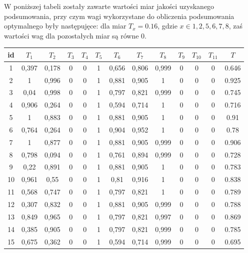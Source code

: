 \documentclass{classrep}
\begin{document}
W poniższej tabeli zostały zawarte wartości miar jakości uzyskanego podsumowania, przy czym wagi wykorzystane do
obliczenia podsumowania optymalnego były następujęce: dla miar $T_{x} = 0.16$, gdzie $x \in {1,2,5,6,7,8}$, zaś wartości wag dla pozostałych miar są równe 0.

\begin{center}
  \begin{table}[H]
    \begin{adjustbox}{center=11cm}
    \begin{tabularx}{\textwidth}{ccccccccccccc}
    
    id & $T_1$ & $T_2$ & $T_3$ & $T_4$ & $T_5$ & $T_6$ & $T_7$ & $T_8$ & $T_9$ & $T_{10}$ & $T_{11}$ & $T$ \\ \hline 

    1 &0,397 & 0,178 & 0 & 0 & 1 & 0,656 & 0,806 & 0,999 & 0 & 0 & 0 & 0.646 \\ \hline
    2 &1 & 0,996 & 0 & 0 & 1 & 0,881 & 0,905 & 1 & 0 & 0 & 0 & 0.925\\ \hline
    3 &0,04 & 0,998 & 0 & 0 & 1 & 0,797 & 0,821 & 0,999 & 0 & 0 & 0 & 0.745 \\ \hline
    4 &0,906 & 0,264 & 0 & 0 & 1 & 0,594 & 0,714 & 1 & 0 & 0 & 0 & 0.716  \\ \hline
    5 & 1 & 0,883 & 0 & 0 & 1 & 0,881 & 0,905 & 1 & 0 & 0 & 0 & 0.91   \\ \hline  
    6 & 0,764 & 0,264 & 0 & 0 & 1 & 0,904 & 0,952 & 1 & 0 & 0 & 0 & 0.78  \\ \hline  
    7 & 1 & 0,877 & 0 & 0 & 1 & 0,881 & 0,905 & 0,999 & 0 & 0 & 0 & 0.906\\ \hline 
    8 & 0,798 & 0,094 & 0 & 0 & 1 & 0,761 & 0,894 & 0,999 & 0 & 0 & 0 & 0.728 \\ \hline 
    9 & 0,22 & 0,891 & 0 & 0 & 1 & 0,881 & 0,905 & 1 & 0 & 0 & 0 & 0.783\\ \hline 
    10 & 0,961 & 0,55 & 0 & 0 & 1 & 0,81 & 0,916 & 1 & 0 & 0 & 0 & 0.838 \\ \hline 
    11 &0,568 & 0,747 & 0 & 0 & 1 & 0,797 & 0,821 & 1 & 0 & 0 & 0 & 0.789\\ \hline
    12 & 0,307 & 0,832 & 0 & 0 & 1 & 0,881 & 0,905 & 0,999 & 0 & 0 & 0 & 0.788 \\ \hline
    13 & 0,849 & 0,965 & 0 & 0 & 1 & 0,797 & 0,821 & 0,997 & 0 & 0 & 0 & 0.869 \\ \hline
    14 & 0,385 & 0,905 & 0 & 0 & 1 & 0,797 & 0,821 & 0,999 & 0 & 0 & 0 & 0.785\\ \hline
    15 & 0,675 & 0,362 & 0 & 0 & 1 & 0,594 & 0,714 & 0,999 & 0 & 0 & 0 & 0.695 \\ \hline

\end{tabularx}
\end{adjustbox}
\end{table}
\end{center}
\end{document}
